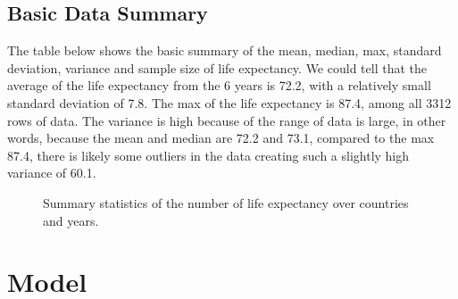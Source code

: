 \documentclass[
  letterpaper,
  DIV=11,
  numbers=noendperiod]{scrartcl}
\begin{document}
\subsection{Basic Data Summary}\label{basic-data-summary}

The table below shows the basic summary of the mean, median, max,
standard deviation, variance and sample size of life expectancy. We
could tell that the average of the life expectancy from the 6 years is
72.2, with a relatively small standard deviation of 7.8. The max of the
life expectancy is 87.4, among all 3312 rows of data. The variance is
high because of the range of data is large, in other words, because the
mean and median are 72.2 and 73.1, compared to the max 87.4, there is
likely some outliers in the data creating such a slightly high variance
of 60.1.

\begin{figure}


\caption{\label{fig-summary}Summary statistics of the number of life
expectancy over countries and years.}

\end{figure}%

\section{Model}\label{model}
\end{document}

